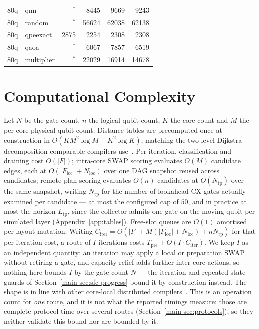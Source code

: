 \documentclass[journal]{IEEEtran}
\newcommand{\mainProtocols}{Section~\ref{main-sec:protocols}}
\newcommand{\mainProgress}{Section~\ref{main-sec:sfc-progress}}
\begin{document}
\begin{table}[h]
{\begin{tabular}{@{}ll rrrr@{}}
80q & qnn         &  $^{\ast}$ &       8445 &       9669 &       9243 \\
80q & random      &  $^{\ast}$ &      56624 &      62038 &      62138 \\
80q & qpeexact    &       2875 &       2254 &       2308 &       2308 \\
80q & qaoa        &  $^{\ast}$ &       6067 &       7857 &       6519 \\
80q & multiplier  &  $^{\ast}$ &      22029 &      16914 &      14678 \\
\bottomrule
\end{tabular}%
}
\end{table}

\section{Computational Complexity}
\label{sec:sfc-complexity}

Let $N$ be the gate count, $n$ the logical-qubit count, $K$ the core
count and $M$ the per-core physical-qubit count. Distance tables are
precomputed once at construction in $O(KM^2\log M + K^2\log K)$,
matching the two-level Dijkstra decomposition comparable compilers
use~\cite{lidsabre}. Per iteration, classification and draining cost
$O(|F|)$; intra-core SWAP scoring evaluates $O(M)$ candidate edges,
each at $O(|F_\mathrm{loc}| + N_\mathrm{loc})$ over one DAG snapshot
reused across candidates; remote-plan scoring evaluates $O(n)$
candidates at $O(N_\mathrm{tp})$ over the same snapshot, writing
$N_\mathrm{tp}$ for the number of lookahead CX gates actually examined per
candidate --- at most the configured cap of $50$, and in practice at most
the horizon $L_\mathrm{tp}$, since the collector admits one gate on the
moving qubit per simulated layer (Appendix~\ref{app:tables}). Free-slot
queues are $O(1)$ amortised per layout mutation. Writing
$C_\mathrm{iter} = O(\lvert F\rvert + M(\lvert F_\mathrm{loc}\rvert +
N_\mathrm{loc}) + n N_\mathrm{tp})$ for that per-iteration cost, a route
of $I$ iterations costs $T_\mathrm{pre} + O(I \cdot C_\mathrm{iter})$.
We keep $I$ as an independent quantity: an iteration may apply a local or
preparation SWAP without retiring a gate, and capacity relief adds further
inter-core actions, so nothing here bounds $I$ by the gate count $N$ ---
the iteration and repeated-state guards of \mainProgress{} bound it by
construction instead. The shape is in line with other core-local
distributed compilers~\cite{lidsabre,russo2025telesabre}. This is an
operation count for \emph{one} route, and it is not what the reported
timings measure: those are complete protocol time over several routes
(\mainProtocols{}), so they neither validate this bound nor are bounded by
it.
\end{document}
